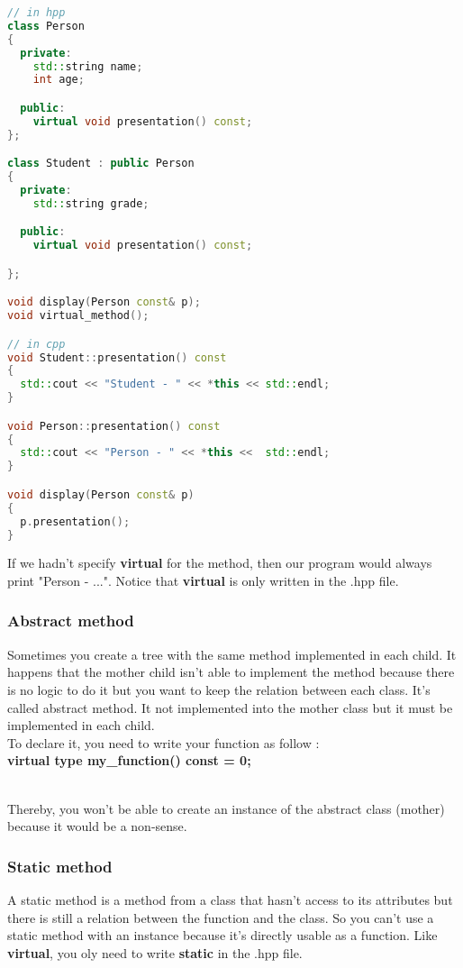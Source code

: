 \documentclass[a4paper, 12pt, titlepage]{scrartcl} %
\begin{document}
\begin{lstlisting}[language=C++]
// in hpp
class Person
{
  private:
    std::string name;
    int age;

  public:
    virtual void presentation() const;
};

class Student : public Person
{
  private:
    std::string grade;

  public:
    virtual void presentation() const;

};

void display(Person const& p);
void virtual_method();

// in cpp
void Student::presentation() const
{
  std::cout << "Student - " << *this << std::endl;
}

void Person::presentation() const
{
  std::cout << "Person - " << *this <<  std::endl;
}

void display(Person const& p)
{
  p.presentation();
}
\end{lstlisting} \vspace{5mm}

If we hadn't specify \textbf{virtual} for the method, then our program would always print "Person - ...". Notice that \textbf{virtual} is only written in the .hpp file.

\subsubsection{Abstract method}
Sometimes you create a tree with the same method implemented in each child. It happens that the mother child isn't able to implement the method because there is no logic to do it but you want to keep the relation between each class. It's called abstract method. It not implemented into the mother class but it must be implemented in each child. 
\\ To declare it, you need to write your function as follow : \\ \textbf{virtual type my\_function() const = 0;}

\\ Thereby, you won't be able to create an instance of the abstract class (mother) because it would be a non-sense.

\subsubsection{Static method}
A static method is a method from a class that hasn't access to its attributes but there is still a relation between the function and the class. So you can't use a static method with an instance because it's directly usable as a function. Like \textbf{virtual}, you oly need to write \textbf{static} in the .hpp file. 
\end{document}
